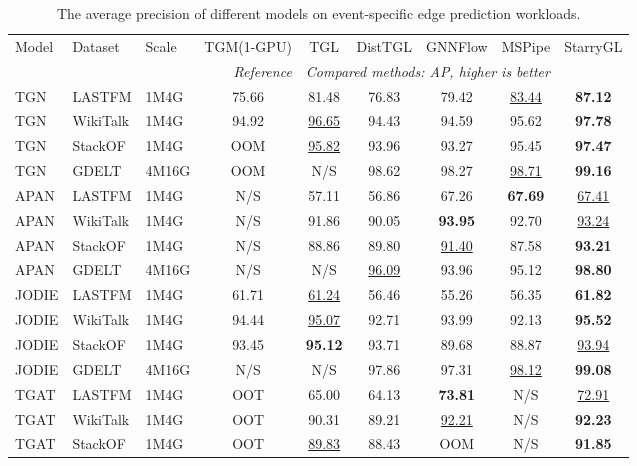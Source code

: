 \begin{table}[b]
\centering
\caption{The average precision of different models on event-specific edge prediction workloads. }
\vspace{-10pt}
\label{tab:ctdg_accuracy}
\scriptsize
\setlength{\tabcolsep}{3pt}
\begin{tabular}{lll|c|ccccc}
\toprule
Model & Dataset & Scale & TGM(1-GPU) & TGL & DistTGL & GNNFlow & MSPipe & StarryGL \\
\multicolumn{3}{r}{ } &\multicolumn{1}{r}{\textit{Reference}} & \multicolumn{5}{l}{\textit{Compared methods: AP, higher is better}} \\
\midrule
TGN & LASTFM & 1M4G & 75.66 & 81.48 & 76.83 & 79.42 & \underline{83.44} & \textbf{87.12} \\
TGN & WikiTalk & 1M4G & 94.92 & \underline{96.65} & 94.43 & 94.59 & 95.62 & \textbf{97.78} \\
TGN & StackOF & 1M4G & OOM & \underline{95.82} & 93.96 & 93.27 & 95.45 & \textbf{97.47} \\
TGN & GDELT & 4M16G & OOM & N/S & 98.62 & 98.27 & \underline{98.71} & \textbf{99.16} \\
\midrule
APAN & LASTFM & 1M4G & N/S & 57.11 & 56.86 & 67.26 & \textbf{67.69} & \underline{67.41} \\
APAN & WikiTalk & 1M4G & N/S & 91.86 & 90.05 & \textbf{93.95} & 92.70 & \underline{93.24} \\
APAN & StackOF & 1M4G & N/S & 88.86 & 89.80 & \underline{91.40} & 87.58 & \textbf{93.21} \\
APAN & GDELT & 4M16G & N/S & N/S & \underline{96.09} & 93.96 & 95.12 & \textbf{98.80} \\
\midrule
JODIE & LASTFM & 1M4G & 61.71 & \underline{61.24} & 56.46 & 55.26 & 56.35 & \textbf{61.82} \\
JODIE & WikiTalk & 1M4G & 94.44 & \underline{95.07} & 92.71 & 93.99 & 92.13 & \textbf{95.52} \\
JODIE & StackOF & 1M4G & 93.45 & \textbf{95.12} & 93.71 & 89.68 & 88.87 & \underline{93.94} \\
JODIE & GDELT & 4M16G & N/S & N/S & 97.86 & 97.31 & \underline{98.12} & \textbf{99.08} \\
\midrule
TGAT & LASTFM & 1M4G & OOT & 65.00 & 64.13 & \textbf{73.81} & N/S & \underline{72.91} \\
TGAT & WikiTalk & 1M4G & OOT & 90.31 & 89.21 & \underline{92.21} & N/S & \textbf{92.23} \\
TGAT & StackOF & 1M4G & OOT & \underline{89.83} & 88.43 & OOM & N/S & \textbf{91.85} \\

\end{tabular}
\end{table}
